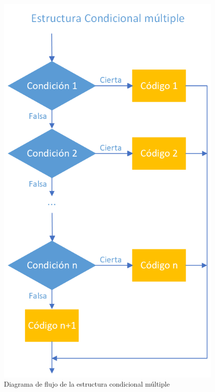\documentclass[
  a4paper,
]{scrreport}
\theoremstyle{definition}
\theoremstyle{definition}
\theoremstyle{remark}
\begin{document}
\begin{figure}

{\centering \includegraphics{./img/04-estructuras-control/condicional-multiple.png}

}

\caption{Diagrama de flujo de la estructura condicional múltiple}

\end{figure}
\end{document}
